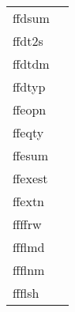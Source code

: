 \documentclass[11pt]{book}
\begin{document}
\begin{tabular}{lr}
ffdsum  & \pageref{ffdsum} \\
ffdt2s  & \pageref{ffdt2s} \\
ffdtdm   & \pageref{ffdtdm} \\
ffdtyp    & \pageref{ffdtyp} \\
ffeopn    & \pageref{ffopen} \\
ffeqty    & \pageref{ffgtcl} \\
ffesum  & \pageref{ffesum} \\
ffexest  & \pageref{ffexist} \\
ffextn   & \pageref{ffextn} \\
ffffrw    & \pageref{ffffrw} \\
ffflmd      & \pageref{ffflmd} \\
ffflnm      & \pageref{ffflnm} \\
ffflsh     & \pageref{ffflus} \\
\end{tabular}
\end{document}
